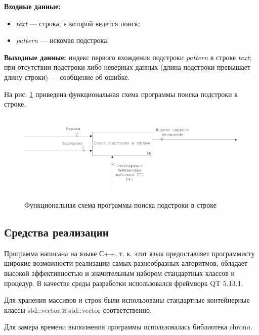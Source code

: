 \documentclass[a4paper,12pt]{article}
\begin{document}
\begin{flushleft}
\textbf{Входные данные:} 
\begin{itemize}
\item \textit{text} --- строка, в которой ведется поиск;
\item \textit{pattern} --- искомая подстрока.
\end{itemize}
	
\textbf{Выходные данные:} индекс первого вхождения
подстроки \textit{pattern} в строке
\textit{text}; при отсутствии подстроки либо неверных данных
(длина подстроки превышает длину строки) --- сообщение об ошибке.
\end{flushleft}
	
На рис. \ref{fig:idef0} приведена 
функциональная схема 
программы поиска подстроки в строке.
        
\begin{figure}[h!]
\begin{center}
{\includegraphics[width = \textwidth]{img/idef0.png}}
\caption{Функциональная схема 
программы поиска подстроки в строке}
\label{fig:idef0}
\end{center}
\end{figure}
	
\newpage
\subsection{Средства реализации}

Программа написана на языке С++, т. к. этот язык предоставляет программисту широкие возможности реализации самых разнообразных алгоритмов, обладает высокой эффективностью и значительным набором стандартных классов и процедур. В качестве среды разработки использовался  фреймворк QT 5.13.1.
	
	Для хранения массивов и строк были использованы стандартные контейнерные классы std::vector и std::vector соответственно.
	
	Для замера времени выполнения программы использовалась библиотека chrono.
	
\end{document}
